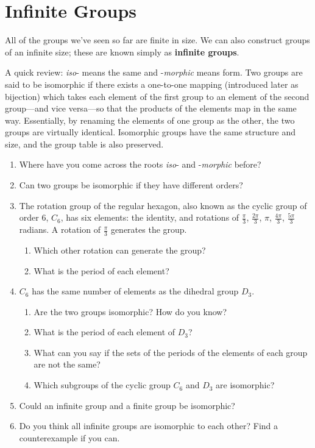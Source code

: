 \documentclass[../gatm.tex]{subfiles}
\begin{document}
\section{Infinite Groups}


All of the groups we've seen so far are finite in size. We can also construct groups of an infinite size; these are known simply as \textbf{infinite groups}.

A quick review: \textit{iso}- means the same and -\textit{morphic} means form. Two groups are said to be isomorphic if there exists a one-to-one mapping (introduced later as bijection) which takes each element of the first group to an element of the second group---and vice versa---so that the products of the elements map in the same way. Essentially, by renaming the elements of one group as the other, the two groups are virtually identical. Isomorphic groups have the same structure and size, and the group table is also preserved.

\begin{enumerate}
\item Where have you come across the roots \textit{iso}- and -\textit{morphic} before?
\item Can two groups be isomorphic if they have different orders?
\item The rotation group of the regular hexagon, also known as the cyclic group of order $6$, $C_6$, has six elements: the identity, and rotations of $\frac{\pi}{3}$, $\frac{2\pi}{3}$, $\pi$, $\frac{4\pi}{3}$, $\frac{5\pi}{3}$ radians. A rotation of $\frac{\pi}{3}$ generates the group.
\begin{enumerate}
\item Which other rotation can generate the group?
\item What is the period of each element?
\end{enumerate}
\item $C_6$ has the same number of elements as the dihedral group $D_3$.
\begin{enumerate}
\item Are the two groups isomorphic? How do you know?
\item What is the period of each element of $D_3$?
\item What can you say if the sets of the periods of the elements of each group are not the same?
\item Which subgroups of the cyclic group $C_6$ and $D_3$ are isomorphic?
\end{enumerate}
\item Could an infinite group and a finite group be isomorphic?
\item Do you think all infinite groups are isomorphic to each other? Find a counterexample if you can.
\setcounter{inf_problem_i}{\value{enumi}}
\end{enumerate}
\end{document}
